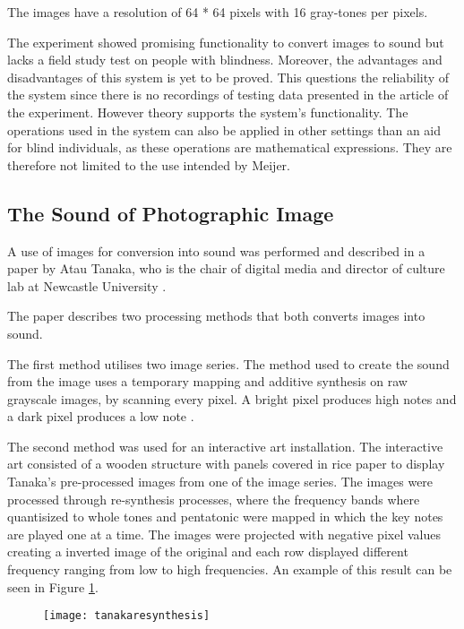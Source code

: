   
The images have a resolution of 64 * 64 pixels with 16 gray-tones per pixels.  

The experiment showed promising functionality to convert images to sound but lacks a field study test on people with blindness. Moreover, the advantages and disadvantages of this system is yet to be proved. This questions the reliability of the system since there is no recordings of testing data presented in the article of the experiment. However theory supports the system's functionality. The operations used in the system can also be applied in other settings than an aid for blind individuals, as these operations are mathematical expressions. They are therefore not limited to the use intended by Meijer.

\subsection{The Sound of Photographic Image}\label{sec:soundarticle}

A use of images for conversion into sound was performed and described in a paper by Atau Tanaka, who is the chair of digital media and director of culture lab at Newcastle University \cite{Tanaka2012}.

The paper describes two processing methods that both converts images into sound.

The first method utilises two image series. The method used to create the sound from the image uses a temporary mapping and additive synthesis on raw grayscale images, by scanning every pixel. A bright pixel produces high notes and a dark pixel produces a low note \cite{Tanaka2012}.

The second method was used for an interactive art installation. The interactive art consisted of a wooden structure with panels covered in rice paper to display Tanaka's pre-processed images from one of the image series. The images were processed through re-synthesis processes, where the frequency bands where quantisized to whole tones and pentatonic were mapped in which the key notes are played one at a time. The images were projected with negative pixel values creating a inverted image of the original and each row displayed different frequency ranging from low to high frequencies. An example of this result can be seen in Figure \ref{fig:tanakaresynthesis}.  

\begin{figure}[!h]
\centering
\texttt{[image: tanakaresynthesis]}
\caption{\label{fig:tanakaresynthesis}\cite{Tanaka2012}}
\end{figure}
\cite{Tanaka2012}

